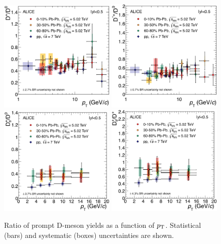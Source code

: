 \begin{figure}[!t]
\centering
\includegraphics[angle=0, width=0.49\textwidth]{FigCap5/RatioDplusDzero-PbPb-010-3050-6080-502-pp-7.eps}
\includegraphics[angle=0, width=0.49\textwidth]{FigCap5/RatioDstarDzero-PbPb-010-3050-6080-502-pp-7.eps}
\includegraphics[angle=0, width=0.49\textwidth]{FigCap5/RatioDsD0-PbPb-010-3050-6080-502-pp-7.eps}
\includegraphics[angle=0, width=0.49\textwidth]{FigCap5/RatioDsDplus-PbPb-010-3050-6080-502-pp-7.eps}
 \caption{Ratio of prompt D-meson yields as a function of $p_{\rm T}$.
Statistical (bars) and systematic (boxes) uncertainties are shown.}
 \label{fig:DmesRatio} 
\end{figure} 

